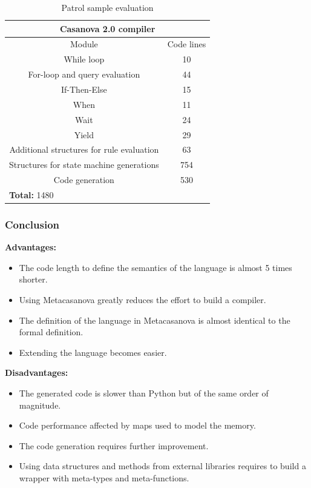 \documentclass[10pt,a4paper]{beamer}
\begin{document}
\begin{frame}
\begin{table}
\begin{tabular}{|c|c|}
			\hline
			\multicolumn{2}{|c|}{\textbf{Casanova 2.0 compiler}} \\
			\hline
			Module & Code lines \\
			\hline
			While loop & 10 \\
			\hline
			For-loop and query evaluation & 44 \\
			\hline
			If-Then-Else & 15 \\
			\hline
			When & 11 \\
			\hline
			Wait & 24 \\
			\hline
			Yield & 29 \\
			\hline
			Additional structures for rule evaluation & 63 \\
			\hline
			Structures for state machine generations & 754 \\
			\hline
			Code generation & 530 \\
			\hline
			\multicolumn{2}{|l|}{\textbf{Total: } 1480} \\
			\hline			
		\end{tabular}
		\caption{Patrol sample evaluation}
		\label{tab:evaluation}
	\end{table}	
\end{frame}

\begin{frame}
	\frametitle{Conclusion}
	\textbf{Advantages:}
	\begin{itemize}
		\item The code length to define the semantics of the language is almost 5 times shorter.
		\item Using Metacasanova greatly reduces the effort to build a compiler.
		\item The definition of the language in Metacasanova is almost identical to the formal definition.
		\item Extending the language becomes easier.
	\end{itemize}
	\textbf{Disadvantages:}
	\begin{itemize}
		\item The generated code is slower than Python but of the same order of magnitude.
		\item Code performance affected by maps used to model the memory.
		\item The code generation requires further improvement.
		\item Using data structures and methods from external libraries requires to build a wrapper with meta-types and meta-functions.
	\end{itemize}
\end{frame}
\end{document}
